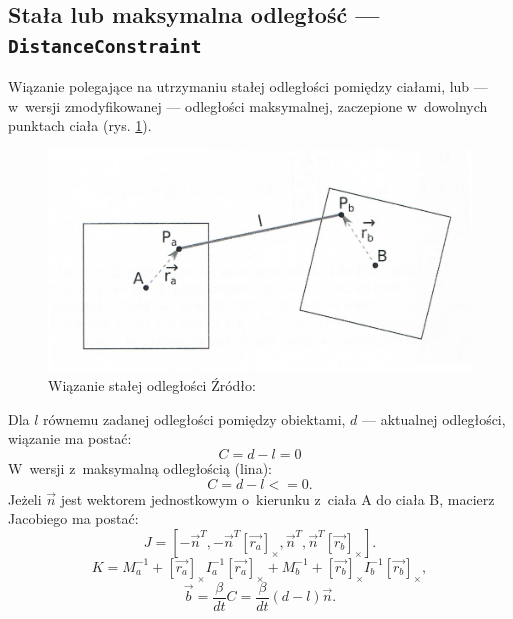 \subsection*{Stała lub maksymalna odległość --- \texttt{DistanceConstraint}}
Wiązanie polegające na utrzymaniu stałej odległości pomiędzy ciałami, lub --- w~wersji zmodyfikowanej --- odległości maksymalnej, zaczepione w~dowolnych punktach ciała (rys. \ref{fig:wiazanie-odleglosci}). 

\begin{figure}[th]
	\centering
	\includegraphics[width=0.9\linewidth]{images/distance-constraint}
	\caption[Wiązanie stałej odległości]{Wiązanie stałej odległości \newline Źródło: \cite{bib:barnas}}
	\label{fig:wiazanie-odleglosci}
\end{figure}


Dla $l$ równemu zadanej odległości pomiędzy obiektami, $d$ --- aktualnej odległości, wiązanie ma postać:
\begin{equation}
C = d-l = 0
\end{equation}
W~wersji z~maksymalną odległością (lina):
\begin{equation}
C = d-l <=0.
\end{equation}
Jeżeli $\vec{n}$ jest wektorem jednostkowym o~kierunku z~ciała A do ciała B, macierz Jacobiego ma postać:
\begin{equation}
J = [-\vec{n}^T, -\vec{n}^T[\vec{r_a}]_\times, \vec{n}^T, \vec{n}^T[\vec{r_b}]_\times].
\end{equation}
\begin{equation}
K = M_a^{-1} + [\vec{r_a}]_\times I_a^{-1}[\vec{r_a}]_\times + M_b^{-1} + [\vec{r_b}]_\times I_b^{-1} [\vec{r_b}]_\times,
\end{equation}
\begin{equation}
\vec{b} = \frac{\beta}{dt}C = \frac{\beta}{dt}(d-l)\vec{n}.
\end{equation}
